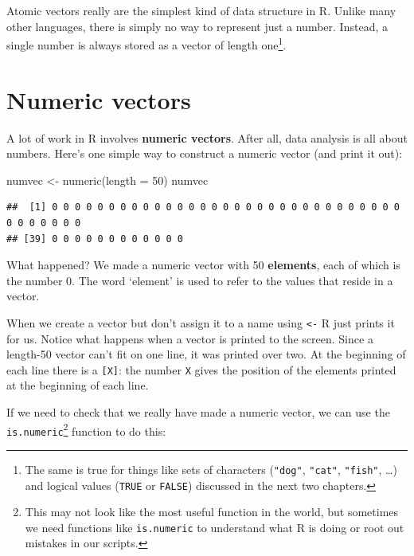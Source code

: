 \documentclass[
]{book}
\newenvironment{Shaded}{\begin{snugshade}}{\end{snugshade}}
\newcommand{\AttributeTok}[1]{\textcolor[rgb]{0.77,0.63,0.00}{#1}}
\newcommand{\DecValTok}[1]{\textcolor[rgb]{0.00,0.00,0.81}{#1}}
\newcommand{\FunctionTok}[1]{\textcolor[rgb]{0.00,0.00,0.00}{#1}}
\newcommand{\NormalTok}[1]{#1}
\newcommand{\OtherTok}[1]{\textcolor[rgb]{0.56,0.35,0.01}{#1}}
\begin{document}
Atomic vectors really are the simplest kind of data structure in R. Unlike many other languages, there is simply no way to represent just a number. Instead, a single number is always stored as a vector of length one\footnote{The same is true for things like sets of characters (\texttt{"dog"}, \texttt{"cat"}, \texttt{"fish"}, \ldots) and logical values (\texttt{TRUE} or \texttt{FALSE}) discussed in the next two chapters.}.

\hypertarget{intro-vectors}{%
\section{Numeric vectors}\label{intro-vectors}}

A lot of work in R involves \textbf{numeric vectors}. After all, data analysis is all about numbers. Here's one simple way to construct a numeric vector (and print it out):

\begin{Shaded}
\begin{Highlighting}[]
\NormalTok{numvec }\OtherTok{\textless{}{-}} \FunctionTok{numeric}\NormalTok{(}\AttributeTok{length =} \DecValTok{50}\NormalTok{)}
\NormalTok{numvec}
\end{Highlighting}
\end{Shaded}

\begin{verbatim}
##  [1] 0 0 0 0 0 0 0 0 0 0 0 0 0 0 0 0 0 0 0 0 0 0 0 0 0 0 0 0 0 0 0 0 0 0 0 0 0 0
## [39] 0 0 0 0 0 0 0 0 0 0 0 0
\end{verbatim}

What happened? We made a numeric vector with 50 \textbf{elements}, each of which is the number 0. The word `element' is used to refer to the values that reside in a vector.

When we create a vector but don't assign it to a name using \texttt{\textless{}-} R just prints it for us. Notice what happens when a vector is printed to the screen. Since a length-50 vector can't fit on one line, it was printed over two. At the beginning of each line there is a \texttt{{[}X{]}}: the number \texttt{X} gives the position of the elements printed at the beginning of each line.

If we need to check that we really have made a numeric vector, we can use the \texttt{is.numeric}\footnote{This may not look like the most useful function in the world, but sometimes we need functions like \texttt{is.numeric} to understand what R is doing or root out mistakes in our scripts.} function to do this:
\end{document}
